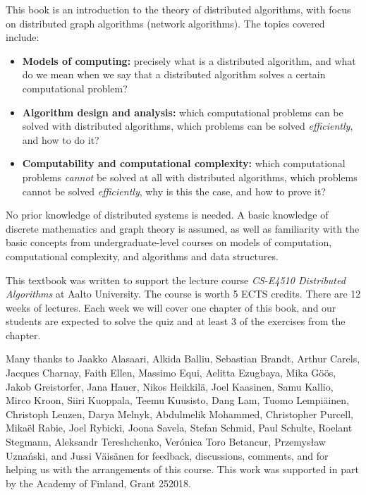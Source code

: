 
This book is an introduction to the theory of distributed algorithms, with focus on distributed graph algorithms (network algorithms). The topics covered include:
\begin{itemize}
    \item \textbf{Models of computing:} precisely what is a distributed algorithm, and what do we mean when we say that a distributed algorithm solves a certain computational problem?
    \item \textbf{Algorithm design and analysis:} which computational problems can be solved with distributed algorithms, which problems can be solved \emph{efficiently}, and how to do it?
    \item \textbf{Computability and computational complexity:} which computational problems \emph{cannot} be solved at all with distributed algorithms, which problems cannot be solved \emph{efficiently}, why is this the case, and how to prove it?
\end{itemize}
No prior knowledge of distributed systems is needed. A basic knowledge of discrete mathematics and graph theory is assumed, as well as familiarity with the basic concepts from undergraduate-level courses on models of computation, computational complexity, and algorithms and data structures.



This textbook was written to support the lecture course \emph{CS-E4510 Distributed Algorithms} at Aalto University. The course is worth 5 ECTS credits. There are 12 weeks of lectures. Each week we will cover one chapter of this book, and our students are expected to solve the quiz and at least 3 of the exercises from the chapter.



Many thanks to
Jaak\-ko Ala\-saari,
Alki\-da Balliu,
Sebastian Brandt,
Arthur Carels,
Jacques Charnay,
Faith Ellen,
Massimo Equi,
Aelitta Ezugbaya,
Mika G\"o\"os,
Ja\-kob Greistorfer,
Jana Hauer,
Nikos Heik\-kil\"a,
Joel Kaa\-si\-nen,
Samu Kal\-lio,
Mir\-co Kroon,
Siiri Kuop\-pala,
Tee\-mu Kuu\-sisto,
Dang Lam,
Tuo\-mo Lem\-pi\"a\-inen,
Christoph Len\-zen,
Darya Melnyk,
Abdul\-melik Mohammed,
Christopher Purcell,
Mika\"el Rabie,
Joel Ry\-bicki,
Joo\-na Sa\-ve\-la,
Stefan Schmid,
Paul Schulte,
Roelant Steg\-mann,
Aleksandr Tereshchenko,
Verónica Toro Betancur,
Przemys\l{}aw Uzna\'nski,
and
Jussi V\"ai\-s\"a\-nen
for feedback, discussions, comments, and for helping us with the arrangements of this course. This work was supported in part by the Academy of Finland, Grant 252018.


